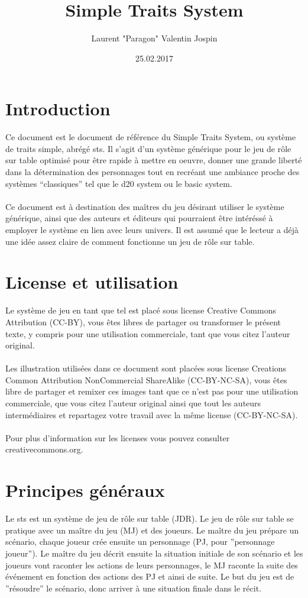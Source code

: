 \documentclass[a4paper,10pt,twoside,twocolumn]{article}
\author{Laurent "Paragon" Valentin Jospin}
\title{Simple Traits System}
\date{25.02.2017}
\begin{document}
  \maketitle
 
 \section{Introduction}
 
 Ce document est le document de référence du Simple Traits System, ou système de traits simple, abrégé sts. Il s'agit d'un système générique pour le jeu de rôle sur table optimisé pour être rapide à mettre en oeuvre, donner une grande liberté dans la détermination des personnages tout en recréant une ambiance proche des systèmes ``classiques'' tel que le d20 system ou le basic system.\\
 \\
 Ce document est à destination des maîtres du jeu désirant utiliser le système générique, ainsi que des auteurs et éditeurs qui pourraient être intéréssé à employer le système en lien avec leurs univers. Il est assumé que le lecteur a déjà une idée assez claire de comment fonctionne un jeu de rôle sur table.
 
 \section{License et utilisation}
 
 Le système de jeu en tant que tel est placé sous license Creative Commons Attribution (CC-BY), vous êtes libres de partager ou transformer le présent texte, y compris pour une utilisation commerciale, tant que vous citez l'auteur original.\\
 \\
 Les illustration utilisées dans ce document sont placées sous license Creations Common Attribution NonCommercial ShareAlike (CC-BY-NC-SA), vous êtes libre de partager et remixer ces images tant que ce n'est pas pour une utilisation commerciale, que vous citez l'auteur original ainsi que tout les auteurs intermédiaires et repartagez votre travail avec la même license (CC-BY-NC-SA).\\
 \\
 Pour plus d'information sur les licenses vous pouvez consulter creativecommons.org.
 
 \section{Principes généraux}
 \label{princip}
 Le sts est un système de jeu de rôle sur table (JDR). Le jeu de rôle sur table se pratique avec un maître du jeu (MJ) et des joueurs. Le maître du jeu prépare un scénario, chaque joueur crée ensuite un personnage (PJ, pour ''personnage joueur''). Le maître du jeu décrit ensuite la situation initiale de son scénario et les joueurs vont raconter les actions de leurs personnages, le MJ raconte la suite des événement en fonction des actions des PJ et ainsi de suite. Le but du jeu est de ''résoudre'' le scénario, donc arriver à une situation finale dans le récit.
 
\end{document}
